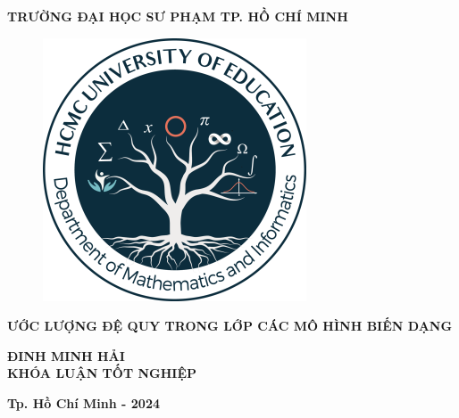 \begin{titlepage}
\begin{center}
{\bf  TRƯỜNG ĐẠI HỌC SƯ PHẠM TP. HỒ CHÍ MINH}\\
\hfill

\vspace*{2cm}

\begin{figure} [ht]
  \centering
  \includegraphics[scale = 0.75]{image/Toan1.png}
\end{figure}
\vspace*{2cm}

{\huge\bf ƯỚC LƯỢNG ĐỆ QUY TRONG LỚP CÁC MÔ HÌNH BIẾN DẠNG}

\vspace*{3cm}
{\large\bf  ĐINH MINH HẢI}\\
{\large\bf  KHÓA LUẬN TỐT NGHIỆP}

\vfill

{\bf Tp. Hồ Chí Minh - 2024}
\end{center}
\end{titlepage}

